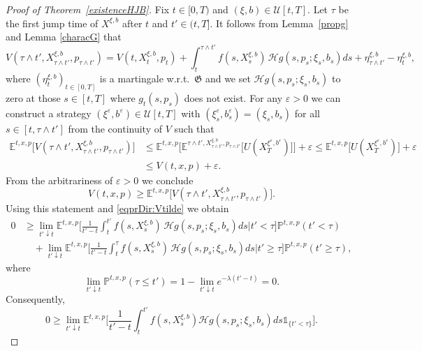 \documentclass[reqno, 11pt]{amsart}%
\newcommand{\Eop}{\mathbb{E}}
\newcommand{\Pop}{\mathbb{P}}
\newcommand{\indicator}{{\mathds 1}}
\newcommand{\Ind}[1]{\indicator_{\{#1\}}}
\newcommand{\xib}{(\xi,b)}
\newcommand{\stprT}[1]{(#1_t)_{t\in[0,T]}}
\theoremstyle{definition}
\numberwithin{equation}{section} \numberwithin{theorem}{section}
\begin{document}
\begin{proof}[Proof of Theorem~\ref{existenceHJB}]
   Fix $t\in[0,T)$ and $\xib\in \mathcal U[t,T]$.
   Let $\tau$ be the first jump time of $X^{\xi,b}$ after $t$ and $t'\in(t,T]$. It follows from Lemma~\ref{propg} and Lemma \ref{characG} that 
   \begin{equation}\label{eqprDir:Vtilde}
   V(\tau\wedge t',X^{\xi,b}_{\tau\wedge t'},p_{\tau\wedge t'}) 
   = V(t,X^{\xi,b}_t,p_t) + \int_t^{\tau\wedge t'} f(s,X^{\xi,b}_s)\,\mathcal{H}g(s,p_s;\xi_s,b_s)ds + \eta^{\xi,b}_{\tau\wedge t'} - \eta^{\xi,b}_t,
   \end{equation}
   where $\stprT{\eta^{\xi,b}}$ is a martingale w.r.t.\ ${\mathfrak G}$ and we set $\mathcal{H}g(s,p_s;\xi_s,b_s)$ to zero at those $s\in[t,T]$ where $g_t(s,p_s)$ does not exist. 
   For any $\varepsilon>0$ we can construct  a strategy $(\xi^\varepsilon,b^\varepsilon)\in \mathcal U[t,T]$ with $(\xi^\varepsilon_s,b^\varepsilon_s)=(\xi_s,b_s)$ for all $s\in[t,\tau\wedge t']$  from the continuity of $V$ such that
   \begin{align*}
   \Eop^{t,x,p}\Big[V(\tau\wedge t',X^{\xi,b}_{\tau\wedge t'},p_{\tau\wedge t'})\Big]
   &\le \Eop^{t,x,p}\Big[\Eop^{\tau\wedge t',X^{\xi,b}_{\tau\wedge t'},p_{\tau\wedge t'}}\Big[U(X_T^{\xi^\varepsilon,b^\varepsilon})\Big]\Big] +\varepsilon 
   \le \Eop^{t,x,p}\Big[U(X_T^{\xi^\varepsilon,b^\varepsilon})\Big]+\varepsilon \\
   &\le V(t,x,p)+\varepsilon.
   \end{align*}
   From the arbitrariness of $\varepsilon>0$ we conclude
   $$V(t,x,p) \ge \Eop^{t,x,p}\Big[V(\tau\wedge t',X^{\xi,b}_{\tau\wedge t'},p_{\tau\wedge t'})\Big]. $$
   Using this statement and \eqref{eqprDir:Vtilde} we obtain 
   \begin{align*}
   0 &\ge \lim_{t'\downarrow t}\Eop^{t,x,p}\bigg[\frac{1}{t'-t}\int_t^{t'} f(s,X^{\xi,b}_s)\,\mathcal{H}g(s,p_s;\xi_s,b_s) ds \big| t'<\tau\bigg]\Pop^{t,x,p}(t'<\tau) \\
   &\quad + \lim_{t'\downarrow t}\Eop^{t,x,p}\bigg[\frac{1}{t'-t}\int_t^{\tau} f(s,X^{\xi,b}_s)\,\mathcal{H}g(s,p_s;\xi_s,b_s)ds\big| t'\ge\tau\bigg]\Pop^{t,x,p}(t'\ge\tau),
   \end{align*}
  where
   \begin{equation*}
   \lim_{t'\downarrow t}\Pop^{t,x,p}(\tau\le t') = 1-\lim_{t'\downarrow t}e^{-\lambda(t'-t)}=0.
   \end{equation*}
   Consequently,
   \begin{equation*}
   0\ge \lim_{t'\downarrow t}\Eop^{t,x,p}\bigg[\frac{1}{t'-t}\int_t^{t'} f(s,X^{\xi,b}_s)\mathcal{H}g(s,p_s;\xi_s,b_s)ds\Ind{t'<\tau}\bigg].

\end{equation*}
\end{proof}
\end{document}
